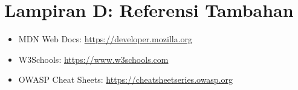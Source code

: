 \section*{Lampiran D: Referensi Tambahan}
\begin{itemize}
  \item MDN Web Docs: \url{https://developer.mozilla.org}
  \item W3Schools: \url{https://www.w3schools.com}
  \item OWASP Cheat Sheets: \url{https://cheatsheetseries.owasp.org}
\end{itemize}

